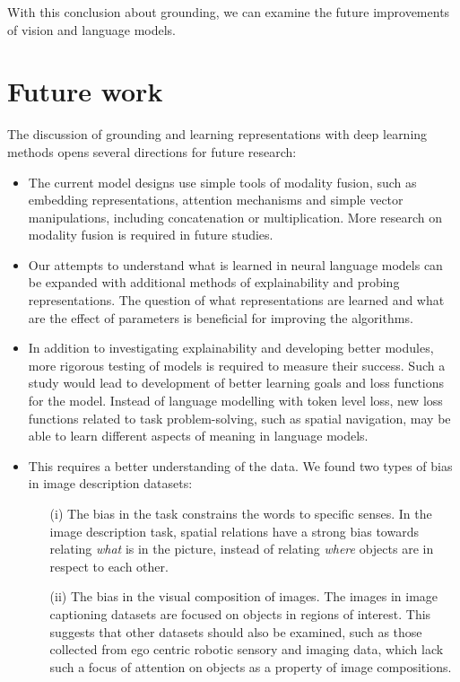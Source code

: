 With this conclusion about grounding, we can examine the future improvements of vision and language models. 

\section{Future work}

The discussion 
of
grounding 
and
learning representations with deep learning methods opens several directions for future research:
\begin{itemize}
	\item The current model designs use simple tools of modality fusion, such as embedding representations, attention mechanisms and simple vector manipulations, including concatenation or multiplication. 
	More research on modality fusion is required in future studies.
	\item Our attempts to understand what is learned in neural language models can be expanded 
	with additional
	methods of explainability and probing representations. 
	The question of what representations are learned and what are the effect of parameters is beneficial for %
	improving
	the algorithms.
	\item In addition to investigating explainability and developing better modules, more rigorous testing of models is required to measure their success. Such a study would 
	lead to development of
	better learning goals and loss functions for the model. Instead of language modelling with token level loss, new loss functions related to task problem-solving, such as spatial navigation, may be able to learn different aspects of meaning in language models. 
	\item This requires a better understanding of the data. We found two types of bias in image description datasets:
	\begin{itemize}
		\item[(i)] The bias in the task constrains the words to specific senses. 
		In the image description task, spatial relations have a strong bias towards relating \emph{what} is in the picture, instead of relating \emph{where} objects are in respect to each other.
		\item[(ii)] The bias in the visual composition of images. The images in image captioning datasets are focused on objects in regions of interest. 
		This suggests that other datasets should also be examined, such as those collected from ego centric robotic sensory and imaging data, which lack such a focus of attention on objects as a property of image compositions.
	\end{itemize}
\end{itemize}
